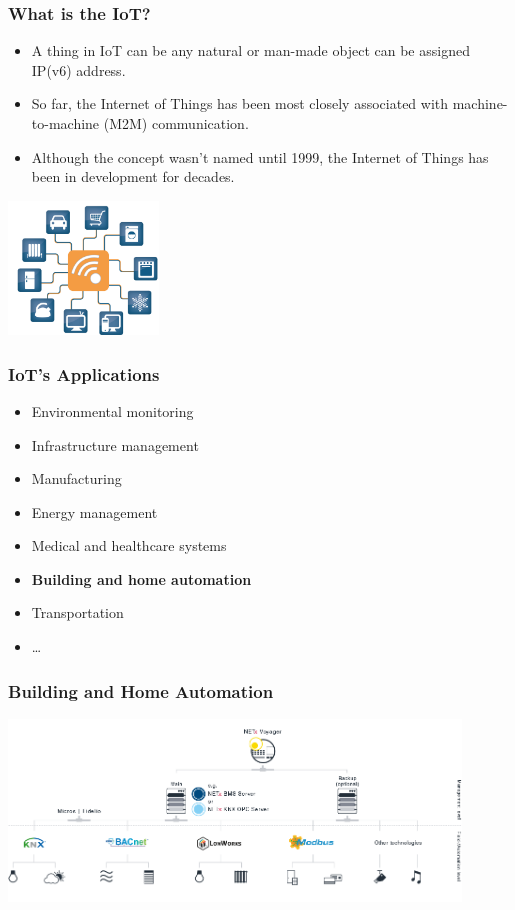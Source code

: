 \documentclass{beamer}
\begin{document}
\begin{frame}
	\frametitle{What is the IoT?}
	\begin{itemize}
		\justifying
		\item A \textcolor{TextGreen}{thing} in IoT can be any natural or man-made object can be assigned \textcolor{TextGreen}{IP(v6) address}.
		\item So far, the Internet of Things has been most closely associated with machine-to-machine (M2M) communication.
		\item Although the concept wasn't named until 1999, the Internet of Things has been in development for decades.
		\end{itemize}
	\vspace{.5cm}
	\hspace*{7cm}\includegraphics[width=4cm]{figs/Internet-of-Things-4.jpg}
\end{frame}

\begin{frame}
	\frametitle{IoT's Applications}
	\begin{itemize}
		\item Environmental monitoring
		\item Infrastructure management
		\item Manufacturing
		\item Energy management
		\item Medical and healthcare systems
		\item \textbf{Building and home automation}
		\item Transportation
		\item \ldots
	\end{itemize}
\end{frame}

\begin{frame}
	\frametitle{Building and Home Automation}
	\includegraphics[width=12cm]{figs/voyager-concept.png}
\end{frame}
\end{document}
